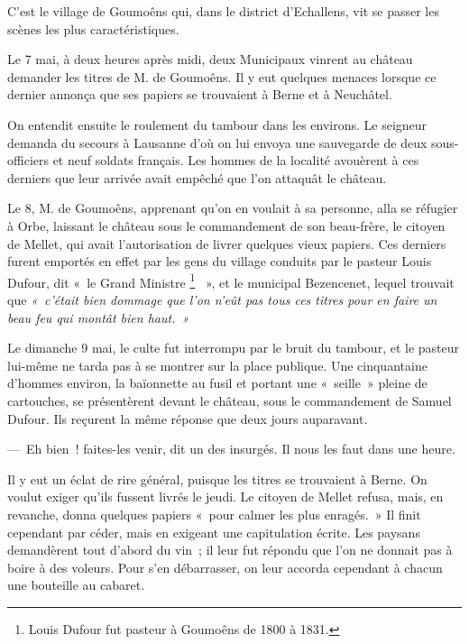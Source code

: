 \documentclass[french,twoside]{book} %
\begin{document}
\noindent C’est le village de Goumoêns qui, dans le district d’Echallens, vit se passer les scènes les plus caractéristiques.\par
Le 7 mai, à deux heures après midi, deux Municipaux vinrent au château demander les titres de M. de Goumoêns. Il y eut quelques menaces lorsque ce dernier annonça que ses papiers se trouvaient à Berne et à Neuchâtel.\par
On entendit ensuite le roulement du tambour dans les environs. Le seigneur demanda du secours à Lausanne d’où on lui envoya une sauvegarde de deux sous-officiers et neuf soldats français. Les hommes de la localité avouèrent à ces derniers que leur arrivée avait empêché que l’on attaquât le château.\par
Le 8, M. de Goumoêns, apprenant qu’on en voulait à sa personne, alla se réfugier à Orbe, laissant le château sous le commandement de son beau-frère, le citoyen de Mellet, qui avait l’autorisation de livrer quelques vieux papiers. Ces derniers furent emportés en effet par les gens du village conduits par le pasteur Louis Dufour, dit « le Grand Ministre \footnote{Louis Dufour fut pasteur à Goumoêns de 1800 à 1831.}  », et le municipal Bezencenet, lequel trouvait que \emph{« c’était bien dommage que l’on n’eût pas tous ces titres pour en faire un beau feu qui montât bien haut. »}\par
Le dimanche 9 mai, le culte fut interrompu par le bruit du tambour, et le pasteur lui-même ne tarda pas à se montrer sur la place publique. Une cinquantaine d’hommes environ, la baïonnette au fusil et portant une « seille » pleine de cartouches, se présentèrent devant le château, sous le commandement de Samuel Dufour. Ils reçurent la même réponse que deux jours auparavant.\par
— Eh bien ! faites-les venir, dit un des insurgés. Il nous les faut dans une heure.\par
Il y eut un éclat de rire général, puisque les titres se trouvaient à Berne. On voulut exiger qu’ils fussent livrés le jeudi. Le citoyen de Mellet refusa, mais, en revanche, donna quelques papiers « pour calmer les plus enragés. » Il finit cependant par céder, mais en exigeant une capitulation écrite. Les paysans demandèrent tout d’abord du vin ; il leur fut répondu que l’on ne donnait pas à boire à des voleurs. Pour s’en débarrasser, on leur accorda cependant à chacun une bouteille au cabaret.\par
\end{document}
